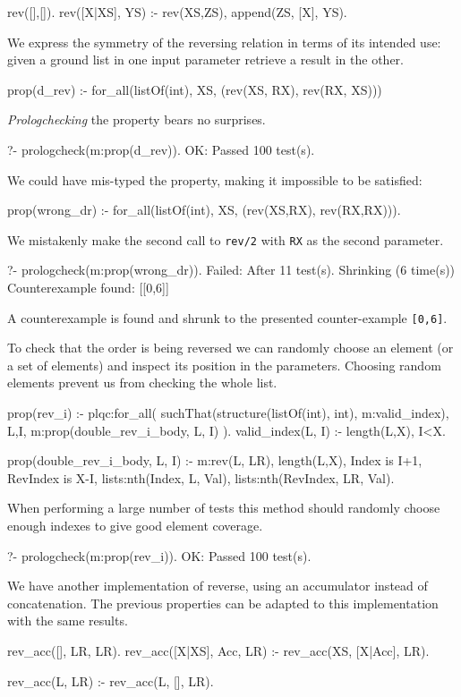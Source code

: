 \documentclass[runningheads,a4paper]{llncs}
\newcommand{\yap}[1]{\lstinline[style=yap]{#1}}
\begin{document}
\begin{yapcode}
 rev([],[]).
 rev([X|XS], YS) :- rev(XS,ZS), append(ZS, [X], YS).
\end{yapcode}
%
We express the symmetry of the reversing relation in terms of
its intended use: given a ground list in one input parameter retrieve a
result in the other.
%
\begin{yapcode}
 prop(d_rev) :- for_all(listOf(int), XS, (rev(XS, RX), rev(RX, XS)))
\end{yapcode}
%
\emph{Prologchecking} the property bears no surprises.
%
\begin{yapcode}
   ?- prologcheck(m:prop(d_rev)).
 OK: Passed 100 test(s).
\end{yapcode}


We could have mis-typed the property, making it impossible to be
satisfied:
%
\begin{yapcode}
 prop(wrong_dr) :-
   for_all(listOf(int), XS, (rev(XS,RX), rev(RX,RX))).
\end{yapcode}
%
We mistakenly make the second call to \yap{rev/2} with \yap{RX} as
the second parameter.
%
\begin{yapcode}
   ?- prologcheck(m:prop(wrong_dr)).
 Failed: After 11 test(s).
 Shrinking (6 time(s))
 Counterexample found: [[0,6]] 
\end{yapcode}
A counterexample is found and shrunk to the presented counter-example
\yap{[0,6]}.


To check that the order is being reversed we can randomly choose an
element (or a set of elements) and inspect its position in the
parameters.
%
Choosing random elements prevent us from checking the whole list.
%
\begin{yapcode}
 prop(rev_i) :- plqc:for_all(
     suchThat(structure({listOf(int), int}), m:valid_index),
     {L,I}, m:prop({double_rev_i_body, L, I}) ).
 valid_index({L, I}) :- length(L,X), I<X.

 prop({double_rev_i_body, L, I}) :- 
   m:rev(L, LR), length(L,X), Index is I+1, RevIndex is X-I,
   lists:nth(Index, L, Val), lists:nth(RevIndex, LR, Val).
\end{yapcode}
%
When performing a large number of tests this method should randomly
choose enough indexes to give good element coverage.
%
\begin{yapcode}
   ?- prologcheck(m:prop(rev_i)).
 OK: Passed 100 test(s).
\end{yapcode}


We have another implementation of reverse, using an accumulator
 instead
of concatenation.
%
The previous properties can be adapted to this implementation with the
same results.
%
\begin{yapcode}
 rev_acc([], LR, LR).
 rev_acc([X|XS], Acc, LR) :- rev_acc(XS, [X|Acc], LR).

 rev_acc(L, LR) :- rev_acc(L, [], LR).
\end{yapcode}
\end{document}
